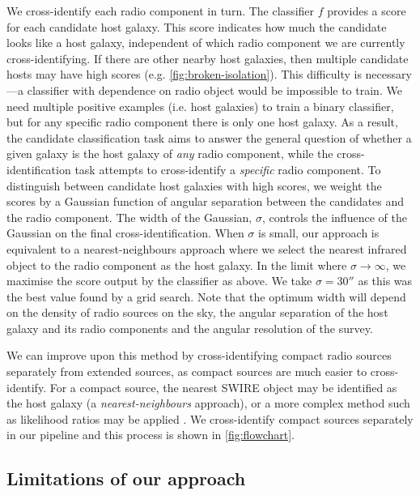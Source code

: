     {We cross-identify each radio component in turn. The classifier $f$
    provides a score for each candidate host galaxy. This score indicates how
    much the candidate looks like a host galaxy, independent of which radio
    component we are currently cross-identifying. If there are other nearby host
    galaxies, then multiple candidate hosts may have high scores (e.g.
    \autoref{fig:broken-isolation}). This difficulty is necessary---a classifier
    with dependence on radio object would be impossible to train. We
    need multiple positive examples (i.e. host galaxies) to train a binary classifier, but
    for any specific radio component there is only one host galaxy. As a
    result, the candidate classification task aims to answer the general question
    of whether a given galaxy is the host galaxy of \emph{any} radio
    component, while the cross-identification task attempts to cross-identify
    a \emph{specific} radio component. To distinguish between candidate host
    galaxies with high scores, we weight the scores by a Gaussian function of
    angular separation between the candidates and the radio component.} The
    width of the Gaussian, $\sigma$, controls the influence of the Gaussian on
    the final cross-identification. When $\sigma$ is small, our approach is
    equivalent to a nearest-neighbours approach where we select the nearest
    infrared object to the radio component as the host galaxy. In the limit
    where $\sigma \to \infty$, we maximise the score output by the
    classifier as above. We take $\sigma = 30''$ as this was the best value
    found by a grid search. {Note that the optimum width will depend on
    the density of radio sources on the sky, the angular separation of the
    host galaxy and its radio components and the angular resolution of the survey.}

    {We can improve upon this method by cross-identifying compact radio sources
    separately from extended sources, as compact sources are much easier to
    cross-identify. For a compact source, the nearest SWIRE object may be
    identified as the host galaxy (a \emph{nearest-neighbours} approach), or a
    more complex method such as likelihood ratios may be applied
    \citep[see][]{weston18lrpy}. We cross-identify compact sources separately
    in our pipeline and this process is shown in \autoref{fig:flowchart}.}

  \subsection{Limitations of our approach}
    \label{sec:atlas-xid-limitations}

